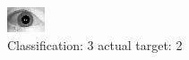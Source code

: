 \begin{figure}[h!]
\begin{center}
\includegraphics[width=0.60\columnwidth]{figures/ID1632_class_3_target_2.png}
\end{center}
\caption{ Classification: 3 actual target: 2}
\label{fig:ID1632_class_3_target_2}
\end{figure}
